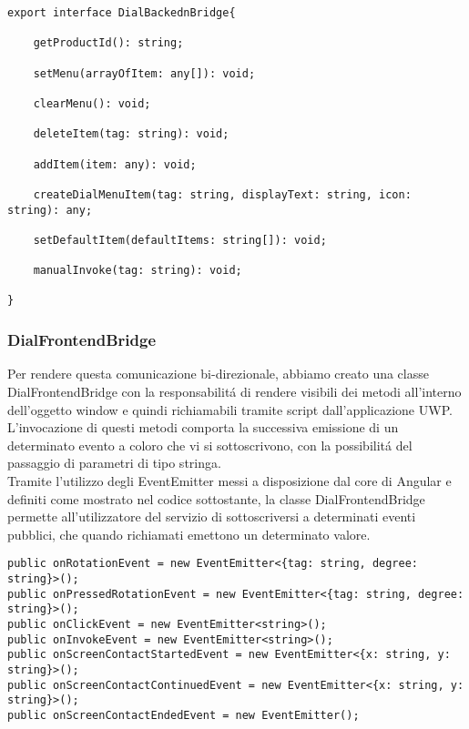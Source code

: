 \vspace{1.0cm}
\begin{lstlisting}[caption={Interfaccia DialBackendBridge},style=javaScriptCode]
export interface DialBackednBridge{
		
	getProductId(): string;
	
	setMenu(arrayOfItem: any[]): void;
	
	clearMenu(): void;
	
	deleteItem(tag: string): void;
	
	addItem(item: any): void;
	
	createDialMenuItem(tag: string, displayText: string, icon: string): any;
	
	setDefaultItem(defaultItems: string[]): void;
	
	manualInvoke(tag: string): void;		

}		
\end{lstlisting} 
\vspace{1.0cm}

\newpage
\subsubsection{DialFrontendBridge}

Per rendere questa comunicazione bi-direzionale, abbiamo creato una classe DialFrontendBridge con la responsabilitá di rendere visibili dei metodi all'interno dell'oggetto window e quindi richiamabili tramite script dall'applicazione UWP.\\

L'invocazione di questi metodi comporta la successiva emissione di un determinato evento a coloro che vi si sottoscrivono, con la possibilitá del passaggio di parametri di tipo stringa.\\

Tramite l'utilizzo degli EventEmitter messi a disposizione dal core di Angular e definiti come mostrato nel codice sottostante, la classe DialFrontendBridge permette all'utilizzatore del servizio di sottoscriversi a determinati eventi pubblici, che quando richiamati emettono un determinato valore.\\

\vspace{1.0cm}
\begin{lstlisting}[caption={EventEmitter esposti da DialFrontendBridge},style=javaScriptCode]
public onRotationEvent = new EventEmitter<{tag: string, degree: string}>();
public onPressedRotationEvent = new EventEmitter<{tag: string, degree: string}>();
public onClickEvent = new EventEmitter<string>();
public onInvokeEvent = new EventEmitter<string>();
public onScreenContactStartedEvent = new EventEmitter<{x: string, y: string}>();
public onScreenContactContinuedEvent = new EventEmitter<{x: string, y: string}>();
public onScreenContactEndedEvent = new EventEmitter();
\end{lstlisting} 
\vspace{1.0cm}

